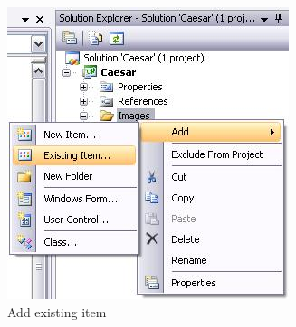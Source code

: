 \begin{figure}[h!]
	\centering
		\includegraphics{figures/add_existing_item.jpg}
	\caption{Add existing item}
	\label{fig:add_existing_item}
\end{figure}

